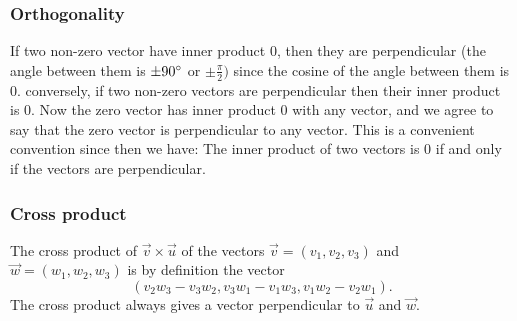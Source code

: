 \documentclass{article}
\begin{document}
		\subsubsection{Orthogonality}
		If two non-zero vector have inner product 0, then they are perpendicular (the angle between them is $\pm 90\degree$ or $\pm\frac{\pi}{2})$ since the cosine of the angle between them is 0. conversely, if two non-zero vectors are perpendicular then their inner product is 0. Now the zero vector has inner product 0 with any vector, and we agree to say that the zero vector is perpendicular to any vector. This is a convenient convention since then we have: The inner product of two vectors is 0 if and only if the vectors are perpendicular.
		
		\subsubsection{Cross product}
		The cross product of $\vec{v}\times\vec{u}$ of the vectors $\vec{v} = (v_1, v_2, v_3)$ and $\vec{w} = (w_1, w_2, w_3)$ is by definition the vector
		\begin{equation*}
			(v_2w_3 - v_3w_2, v_3w_1 - v_1w_3, v_1w_2 - v_2w_1).
		\end{equation*}
		The cross product always gives a vector perpendicular to $\vec{u}$ and $\vec{w}$.
\end{document}
